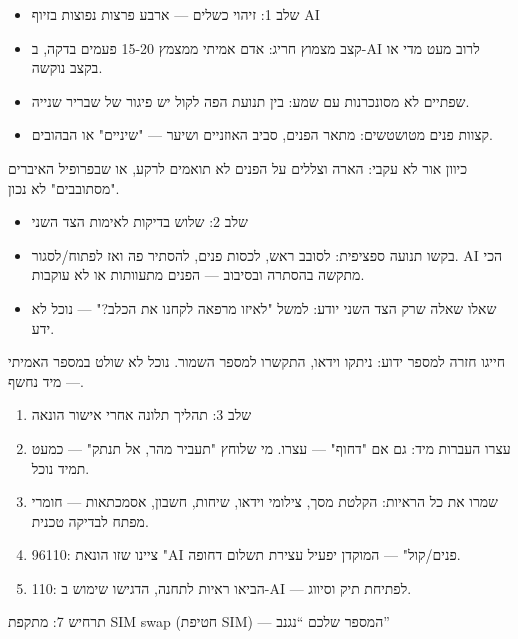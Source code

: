 \begin{itemize}
  \item שלב 1: זיהוי כשלים — ארבע פרצות נפוצות בזיוף AI
  \item קצב מצמוץ חריג: אדם אמיתי ממצמץ 15-20 פעמים בדקה, ב-AI לרוב מעט מדי או בקצב נוקשה.
  \item שפתיים לא מסונכרנות עם שמע: בין תנועת הפה לקול יש פיגור של שבריר שנייה.
  \item קצוות פנים מטושטשים: מתאר הפנים, סביב האוזניים ושיער — "שיניים" או הבהובים.
\end{itemize}

\begin{tcbinfo}{כיוון אור לא עקבי: הארה וצללים על הפנים לא תואמים לרקע, או שבפרופיל האיברים "מסתובבים" לא נכון.}
\begin{itemize}
  \item שלב 2: שלוש בדיקות לאימות הצד השני
  \item בקשו תנועה ספציפית: לסובב ראש, לכסות פנים, להסתיר פה ואז לפתוח/לסגור. AI הכי מתקשה בהסתרה ובסיבוב — הפנים מתעוותות או לא עוקבות.
  \item שאלו שאלה שרק הצד השני יודע: למשל "לאיזו מרפאה לקחנו את הכלב?" — נוכל לא ידע.
\end{itemize}

\end{tcbinfo}

\begin{tcbwarn}{חייגו חזרה למספר ידוע: ניתקו וידאו, התקשרו למספר השמור. נוכל לא שולט במספר האמיתי — מיד נחשף.}
\begin{enumerate}
  \item שלב 3: תהליך תלונה אחרי אישור הונאה
  \item עצרו העברות מיד: גם אם "דחוף" — עצרו. מי שלוחץ "תעביר מהר, אל תנתק" — כמעט תמיד נוכל.
  \item שמרו את כל הראיות: הקלטת מסך, צילומי וידאו, שיחות, חשבון, אסמכתאות — חומרי מפתח לבדיקה טכנית.
  \item 96110: ציינו שזו הונאת "AI פנים/קול" — המוקדן יפעיל עצירת תשלום דחופה.
  \item 110: הביאו ראיות לתחנה, הדגישו שימוש ב-AI — לפתיחת תיק וסיווג.
\end{enumerate}

\end{tcbwarn}


תרחיש 7: מתקפת SIM swap (חטיפת SIM) — המספר שלכם “נגנב”

